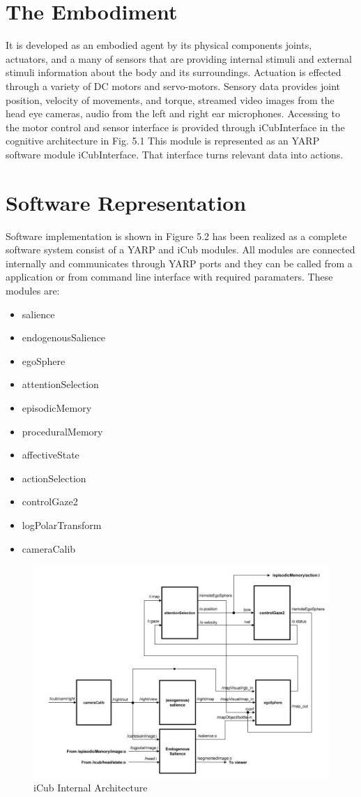 \documentclass[a4paper, 11pt]{report}
\begin{document}
\section{The Embodiment}
It is developed as an embodied agent by its physical components joints, 
actuators, and a many of sensors that are providing internal stimuli and 
external stimuli information about the body and its surroundings. 
Actuation is effected through a variety of DC motors and servo-motors. Sensory 
data provides joint position, velocity of movements, and torque, streamed video 
images from the head eye cameras, audio from the left and right ear 
microphones\cite{9}. Accessing to the motor control and sensor 
interface is provided through iCubInterface in the cognitive architecture in 
Fig. 5.1 This module is represented as an YARP software module iCubInterface.
That interface turns relevant data into actions.
\section{Software Representation}
Software implementation is shown in Figure 5.2 has been realized as a complete 
software system consist of a YARP and iCub modules. All modules are connected 
internally and communicates through YARP ports and they can be called from a 
application or from command line interface with required paramaters. These 
modules are:
\begin{itemize}
  \item salience
  \item endogenousSalience
  \item egoSphere
  \item attentionSelection
  \item episodicMemory
  \item proceduralMemory
  \item affectiveState
  \item actionSelection
  \item controlGaze2
  \item logPolarTransform
  \item cameraCalib
\end{itemize}
\begin{figure}[h!]
  \centering
  \includegraphics[width=0.8\linewidth]{cognitive_architecture_A}
  \caption{iCub Internal Architecture}
  \label{fig:cognitive_architecture_A}
\end{figure} 
\end{document}
